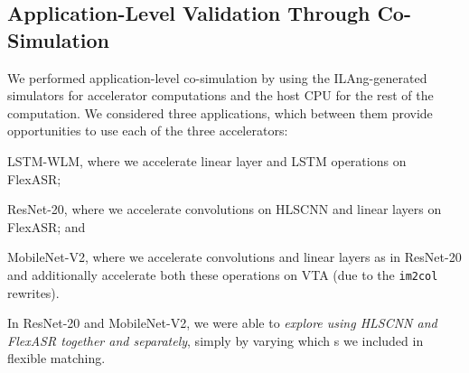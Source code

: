 \subsection{Application-Level Validation Through Co-Simulation}
\label{sec.end-to-end}

We performed application-level co-simulation
  by using the
  ILAng-generated simulators for accelerator computations
  and the host CPU for the rest of the computation.
%
%
We considered three applications,
  which between them provide opportunities to use
  each of the three accelerators: %
\begin{inlinelist}
  \item LSTM-WLM, where we accelerate linear layer and LSTM operations on FlexASR;
  \item ResNet-20, where we accelerate convolutions on HLSCNN and linear layers on FlexASR; and
  \item MobileNet-V2, where we accelerate convolutions and linear layers as in ResNet-20 and additionally accelerate both these operations on VTA (due to the \texttt{im2col} rewrites).
\end{inlinelist}
In ResNet-20 and MobileNet-V2,
  we were able to
  \emph{explore using HLSCNN and FlexASR together and separately}, simply by varying which 
  {\mapping}s
  we included in flexible matching.

